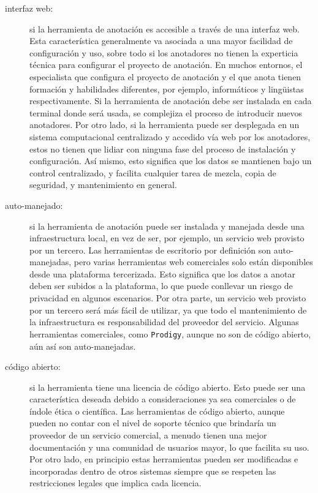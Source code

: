 \begin{description}
  \item[interfaz web:] si la herramienta de anotación es accesible a través de una interfaz web. Esta característica generalmente va asociada a una mayor facilidad de configuración y uso, sobre todo si los anotadores no tienen la experticia técnica para configurar el proyecto de anotación. En muchos entornos, el especialista que configura el proyecto de anotación y el que anota tienen formación y habilidades diferentes, por ejemplo, informáticos y lingüistas respectivamente. Si la herramienta de anotación debe ser instalada en cada terminal donde será usada, se complejiza el proceso de introducir nuevos anotadores. Por otro lado, si la herramienta puede ser desplegada en un sistema computacional centralizado y accedido vía web por los anotadores, estos no tienen que lidiar con ninguna fase del proceso de instalación y configuración. Así mismo, esto significa que los datos se mantienen bajo un control centralizado, y facilita cualquier tarea de mezcla, copia de seguridad, y mantenimiento en general.
  \item[auto-manejado:] si la herramienta de anotación puede ser instalada y manejada desde una infraestructura local, en vez de ser, por ejemplo, un servicio web provisto por un tercero. Las herramientas de escritorio por definición son auto-manejadas, pero varias herramientas web comerciales solo están disponibles desde una plataforma tercerizada. Esto significa que los datos a anotar deben ser subidos a la plataforma, lo que puede conllevar un riesgo de privacidad en algunos escenarios. Por otra parte, un servicio web provisto por un tercero será más fácil de utilizar, ya que todo el mantenimiento de la infraestructura es responsabilidad del proveedor del servicio. Algunas herramientas comerciales, como \texttt{Prodigy}, aunque no son de código abierto, aún así son auto-manejadas.
  \item[código abierto:] si la herramienta tiene una licencia de código abierto. Esto puede ser  una característica deseada debido a consideraciones ya sea comerciales o de índole ética o científica. Las herramientas de código abierto, aunque pueden no contar con el nivel de soporte técnico que brindaría un proveedor de un servicio comercial, a menudo tienen una mejor documentación y una comunidad de usuarios mayor, lo que facilita su uso. Por otro lado, en principio estas herramientas pueden ser modificadas e incorporadas dentro de otros sistemas siempre que se respeten las restricciones legales que implica cada licencia.
\end{description}

